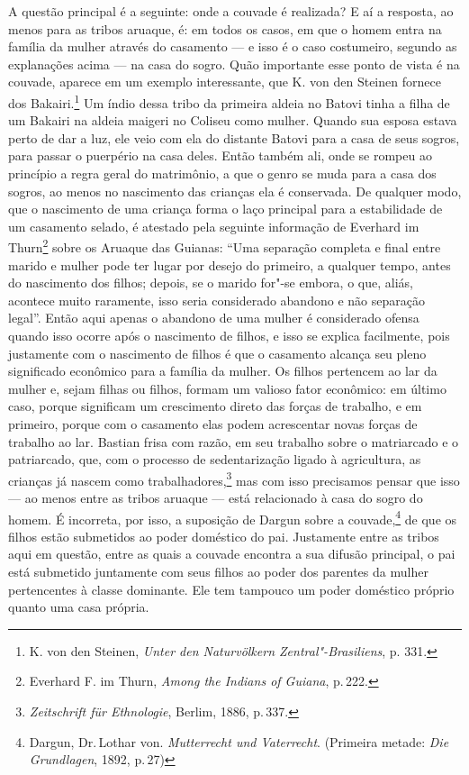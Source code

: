A questão principal é a seguinte: onde a couvade é realizada? E aí a
resposta, ao menos para as tribos aruaque, é: em todos os casos, em que
o homem entra na família da mulher através do casamento --- e isso é o
caso costumeiro, segundo as explanações acima --- na casa do sogro. Quão
importante esse ponto de vista é na couvade, aparece em um exemplo
interessante, que K. von den Steinen fornece dos Bakairi.\footnote{K.
  von den Steinen, \textit{Unter den Naturvölkern Zentral"-Brasiliens}, p.
  331.} Um índio dessa tribo da primeira aldeia no Batovi tinha a filha
de um Bakairi na aldeia maigeri no Coliseu como mulher. Quando sua
esposa estava perto de dar a luz, ele veio com ela do distante Batovi
para a casa de seus sogros, para passar o puerpério na casa deles. Então
também ali, onde se rompeu ao princípio a regra geral do matrimônio, a
que o genro se muda para a casa dos sogros, ao menos no nascimento das
crianças ela é conservada. De qualquer modo, que o nascimento de uma
criança forma o laço principal para a estabilidade de um casamento
selado, é atestado pela seguinte informação de Everhard im
Thurn\footnote{Everhard F. im Thurn, \textit{Among the Indians of Guiana},
  p.\,222.} sobre os Aruaque das Guianas: ``Uma separação completa e
final entre marido e mulher pode ter lugar por desejo do primeiro, a
qualquer tempo, antes do nascimento dos filhos; depois, se o marido
for"-se embora, o que, aliás, acontece muito raramente, isso seria
considerado abandono e não separação legal''. Então aqui apenas o
abandono de uma mulher é considerado ofensa quando isso ocorre após o
nascimento de filhos, e isso se explica facilmente, pois justamente com
o nascimento de filhos é que o casamento alcança seu pleno significado
econômico para a família da mulher. Os filhos pertencem ao lar da
mulher e, sejam filhas ou filhos, formam um valioso fator econômico: em
último caso, porque significam um crescimento direto das forças de
trabalho, e em primeiro, porque com o casamento elas podem acrescentar
novas forças de trabalho ao lar. Bastian frisa com razão, em seu
trabalho sobre o matriarcado e o patriarcado, que, com o processo de
sedentarização ligado à agricultura, as crianças já nascem como
trabalhadores,\footnote{\textit{Zeitschrift für Ethnologie}, Berlim, 1886,
  p.\,337.} mas com isso precisamos pensar que isso --- ao menos entre as
tribos aruaque --- está relacionado à casa do sogro do homem. É
incorreta, por isso, a suposição de Dargun sobre a couvade,\footnote{Dargun,
  Dr.\,Lothar von. \textit{Mutterrecht und Vaterrecht}. (Primeira metade:
  \textit{Die Grundlagen}, 1892, p.\,27)} de que os filhos estão
submetidos ao poder doméstico do pai. Justamente entre as tribos aqui em
questão, entre as quais a couvade encontra a sua difusão principal, o
pai está submetido juntamente com seus filhos ao poder dos parentes da
mulher pertencentes à classe dominante. Ele tem tampouco um poder
doméstico próprio quanto uma casa própria.

